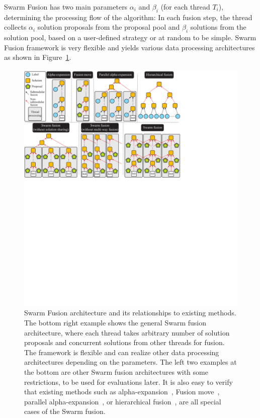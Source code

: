 Swarm Fusion has two main parameters $\alpha_i$ and $\beta_i$ (for each
thread $T_i$), determining the processing flow of the algorithm: In each
fusion step, the thread collects $\alpha_i$ solution proposals from the
proposal pool and $\beta_i$ solutions from the solution pool, based on a
user-defined strategy or at random to be simple.
%
Swarm Fusion framework is very flexible and yields various data
processing architectures as shown in Figure~\ref{fig:model}.
%
\begin{figure}[tb]
 \includegraphics[width=\columnwidth]{figure/model.pdf} \caption{Swarm
 Fusion architecture and its relationships to existing methods. The
 bottom right example shows the general Swarm fusion architecture, where
 each thread takes arbitrary number of solution proposals and concurrent
 solutions from other threads for fusion. The framework is flexible and
 can realize other data processing architectures depending on the parameters.
 The left two examples at the bottom are other Swarm fusion
 architectures with some restrictions, to be used for evaluations later.
 It is also easy to verify that existing methods such as
 alpha-expansion~\cite{alpha_expansion}, Fusion move~\cite{FM}, parallel
 alpha-expansion~\cite{delong}, or hierarchical
 fusion~\cite{delong_hierarchical_fusion,olga}, are all special
 cases of the Swarm fusion.}\label{fig:model}
\end{figure}
